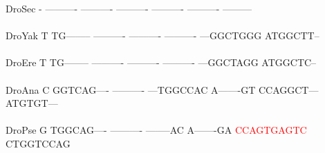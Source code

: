 \documentclass[11pt,twoside,reqno,a4paper]{article}
\begin{document}
{DroSec	-	----------	----------	----------	----------	----------	---------\\
\hspace*{7\charwidth}\hspace*{1\charwidth}\hspace*{1\charwidth}\hspace*{1\charwidth}\hspace*{1\charwidth}\hspace*{1\charwidth}\hspace*{1\charwidth}\\
DroYak	T	TG--------	----------	----------	----------	---GGCTGGG	ATGGCTT--\\
\hspace*{7\charwidth}\hspace*{1\charwidth}\hspace*{1\charwidth}\hspace*{1\charwidth}\hspace*{1\charwidth}\hspace*{1\charwidth}\hspace*{1\charwidth}\\
DroEre	T	TG--------	----------	----------	----------	---GGCTAGG	ATGGCTC--\\
\hspace*{7\charwidth}\hspace*{1\charwidth}\hspace*{1\charwidth}\hspace*{1\charwidth}\hspace*{1\charwidth}\hspace*{1\charwidth}\hspace*{1\charwidth}\\
DroAna	C	GGTCAG----	----------	---TGGCCAC	A-------GT	CCAGGCT---	ATGTGT---\\
\hspace*{7\charwidth}\hspace*{1\charwidth}\hspace*{1\charwidth}\hspace*{1\charwidth}\hspace*{1\charwidth}\hspace*{1\charwidth}\hspace*{1\charwidth}\\
DroPse	G	TGGCAG----	----------	--------AC	A-------GA	\textcolor{Red}{C}\textcolor{Red}{C}\textcolor{Red}{A}\textcolor{Red}{G}\textcolor{Red}{T}\textcolor{Red}{G}\textcolor{Red}{A}\textcolor{Red}{G}\textcolor{Red}{T}\textcolor{Red}{C}	CTGGTCCAG\\
}
\end{document}
